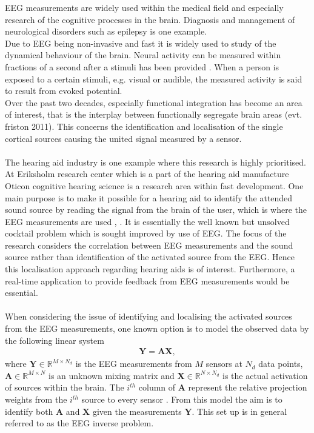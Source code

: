 \noindent
EEG measurements are widely used within the medical field and especially research of the cognitive processes in the brain. Diagnosis and management of neurological disorders such as epilepsy is one example. 
\\   
Due to EEG being non-invasive and fast it is widely used to study of the dynamical behaviour of the brain. Neural activity can be measured within fractions of a second after a stimuli has been provided \cite[p. 3]{fundamentalEEG}. When a person is exposed to a certain stimuli, e.g. visual or audible, the measured activity is said to result from evoked potential.
\\
Over the past two decades, especially functional integration has become an area of interest, that is the interplay between functionally segregate brain areas \cite{Van2019}(evt. friston 2011). This concerns the identification and localisation of the single cortical sources causing the united signal measured by a sensor.
\\ 
\\
The hearing aid industry is one example where this research is highly prioritised. At Eriksholm research center which is a part of the hearing aid manufacture Oticon cognitive hearing science is a research area within fast development. One main purpose is to make it possible for a hearing aid to identify the attended sound source by reading the signal from the brain of the user, which is where the EEG measurements are used \cite{Emina2019}, \cite{Bech2018}. It is essentially the well known but unsolved cocktail problem which is sought improved by use of EEG. The focus of the research considers the correlation between EEG measurements and the sound source rather than identification of the activated source from the EEG. Hence this localisation approach regarding hearing aids is of interest. Furthermore, a real-time application to provide feedback from EEG measurements would be essential. 
\\
\\
When considering the issue of identifying and localising the activated sources from the EEG measurements, one known option is to model the observed data by the following linear system 
\begin{align*}
\mathbf{Y} = \mathbf{AX},
\end{align*}
where $\mathbf{Y} \in \mathbb{R}^{M\times N_d}$ is the EEG measurements from $M$ sensors at $N_d$ data points, $\mathbf{A} \in \mathbb{R}^{M \times N}$ is an unknown mixing matrix and $\mathbf{X} \in \mathbb{R}^{N \times N_d}$ is the actual activation of sources within the brain. The $i^{th}$ column of $\textbf{A}$ represent the relative projection weights from the $i^{th}$ source to every sensor \cite{phd2015}. From this model the aim is to identify both $\textbf{A}$ and $\textbf{X}$ given the measurements $\textbf{Y}$. This set up is in general referred to as the EEG inverse problem.  
